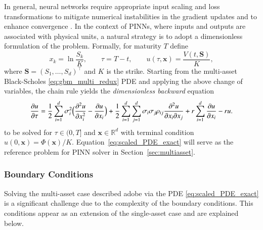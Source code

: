 \documentclass[12pt]{report} %
\theoremstyle{plain} %
\theoremstyle{definition} %
\theoremstyle{remark} %
\begin{document}
In general, neural networks require appropriate input scaling and loss transformations to mitigate 
numerical instabilities in the gradient updates and to enhance convergence \cite{math9010046}. In 
the context of PINNs, where inputs and outputs are associated 
with physical units, a natural strategy is to adopt a dimensionless formulation of the problem. Formally, 
for maturity \(T\) define
\[
x_k=\ln\frac{S_k}{K},\qquad
\tau=T-t,\qquad
u(\tau,\mathbf{x})=\frac{V(t,\mathbf{S})}{K},
\]
where \(\mathbf{S}=(S_1,\dots,S_d)^{\top}\) and
\(K\) is the strike. Starting from the multi-asset Black-Scholes \eqref{eq:gbm_multi_redux} PDE and applying 
the above change of variables, the chain rule yields the
 \emph{dimensionless backward} equation
\begin{equation}
 \frac{\partial u}{\partial \tau} =
 \frac12\sum_{i=1}^{d}\sigma_i^{2}
 \Bigl(
 \frac{\partial^{2}u}{\partial x_i^{2}}
 - \frac{\partial u}{\partial x_i}
 \Bigr)
 + \frac12\sum_{i=1}^{d}\sum_{j=1}^{d}\sigma_i\sigma_j\rho_{ij}
 \frac{\partial^{2}u}{\partial x_i\partial x_j}
 + r\sum_{i=1}^{d}\frac{\partial u}{\partial x_i}
 - ru.
 \label{eq:scaled_PDE_exact}
\end{equation}
to be solved for
\(\tau\in(0,T]\) and \(\mathbf{x}\in\mathbb{R}^{d}\) with terminal
condition \(u(0,\mathbf{x})=\Phi(\mathbf{x})/K\). Equation~\eqref{eq:scaled_PDE_exact} will serve as the reference
problem for PINN solver in Section~\ref{sec:multiasset}.

\subsubsection{Boundary Conditions}

Solving the multi-asset case described adobe via the PDE \eqref{eq:scaled_PDE_exact} is a significant challenge due to the complexity
of the boundary conditions. This conditions appear as an extension of the single-asset case and are explained below.
\end{document}
